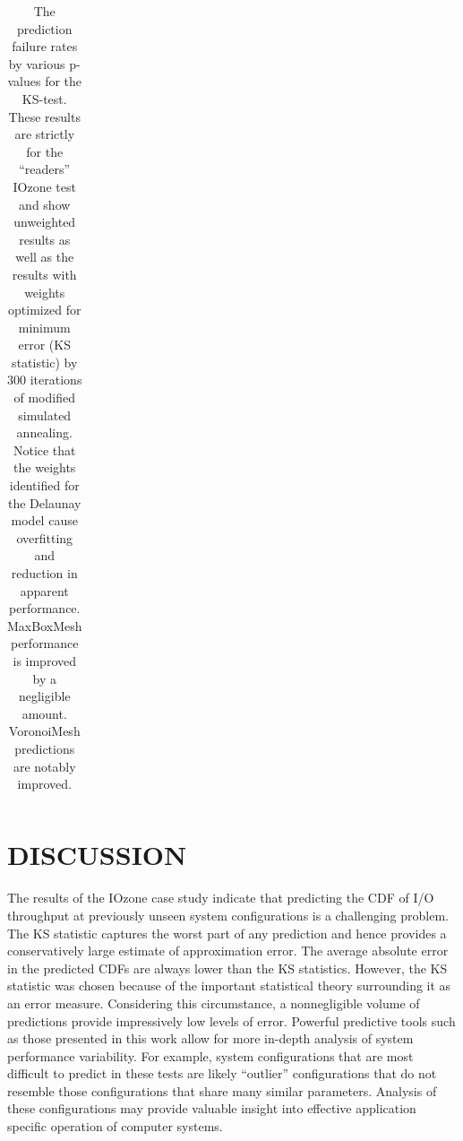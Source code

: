 \documentclass[letterpaper, 10 pt, conference]{ieeeconf}  %
\begin{document}
\begin{table}
\begin{tabular}{c|c|c|c}
    \hline
  \end{tabular}
  \caption{The prediction failure rates by various p-values for the KS-test. These results are strictly for the ``readers'' IOzone test and show unweighted results as well as the results with weights optimized for minimum error (KS statistic) by 300 iterations of modified simulated annealing. Notice that the weights identified for the Delaunay model cause overfitting and reduction in apparent performance. MaxBoxMesh performance is improved by a negligible amount. VoronoiMesh predictions are notably improved.
    \vspace{-.5cm}}
  \label{tab:optimized_p_value_failure_rate}
\end{table}


\section{DISCUSSION}
\label{sec:discussion}

The results of the IOzone case study indicate that predicting the CDF of I/O throughput at previously unseen system configurations is a challenging problem. The KS statistic captures the worst part of any prediction and hence provides a conservatively large estimate of approximation error. The average absolute error in the predicted CDFs are always lower than the KS statistics. However, the KS statistic was chosen because of the important statistical theory surrounding it as an error measure. Considering this circumstance, a nonnegligible volume of predictions provide impressively low levels of error. Powerful predictive tools such as those presented in this work allow for more in-depth analysis of system performance variability. For example, system configurations that are most difficult to predict in these tests are likely ``outlier'' configurations that do not resemble those configurations that share many similar parameters. Analysis of these configurations may provide valuable insight into effective application specific operation of computer systems.
\end{document}
